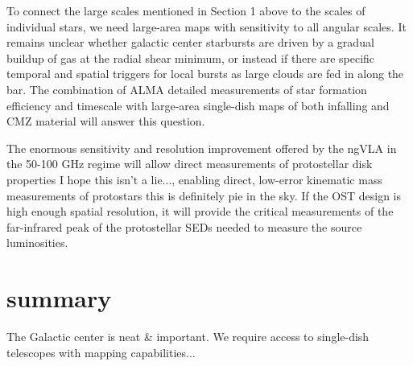 \documentclass[modern]{aastex62}
\def\agnote#1{{\color{red}#1}}
\begin{document}
To connect the large scales mentioned in Section 1 above to the scales of individual stars,
we need large-area maps with sensitivity to all angular scales.  It remains unclear whether
galactic center starbursts are driven by a gradual buildup of gas at the radial shear minimum,
or instead if there are specific temporal and spatial triggers for local bursts as large clouds are fed
in along the bar.  The combination of ALMA detailed measurements of star formation efficiency and timescale
with large-area single-dish maps of both infalling and CMZ material will answer this question.

The enormous sensitivity and resolution improvement offered by the ngVLA in the
50-100 GHz regime will allow direct measurements of protostellar disk
properties \agnote{I hope this isn't a lie...}, enabling direct, low-error kinematic mass
measurements of protostars \agnote{this is definitely pie in the sky}.
If the OST design is high enough spatial resolution, it will provide the critical measurements
of the far-infrared peak of the protostellar SEDs needed to measure the source luminosities.






\section{summary}
The Galactic center is neat \& important.
We require access to single-dish telescopes with mapping capabilities...
\end{document}

